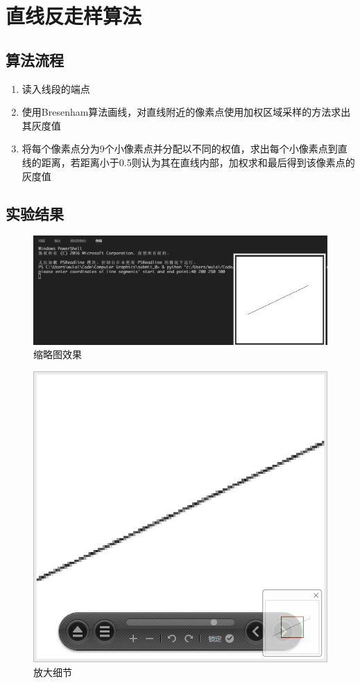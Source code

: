 \documentclass[11pt,UTF8]{article}
\begin{document}
\section{直线反走样算法}
\subsection{算法流程}
	\begin{enumerate}
		\item 读入线段的端点
		\item 使用Bresenham算法画线，对直线附近的像素点使用加权区域采样的方法求出其灰度值
		\item 将每个像素点分为9个小像素点并分配以不同的权值，求出每个小像素点到直线的距离，若距离小于0.5则认为其在直线内部，加权求和最后得到该像素点的灰度值
	\end{enumerate}

\subsection{实验结果}
	\begin{figure}[H]
		\centering
		\includegraphics[width=\textwidth]{demo2.png}
		\caption{缩略图效果}\label{results}
	\end{figure}
	\begin{figure}[H]
		\centering
		\includegraphics[width=\textwidth]{demo3.png}
		\caption{放大细节}\label{results}
	\end{figure}
\newpage
\end{document}
